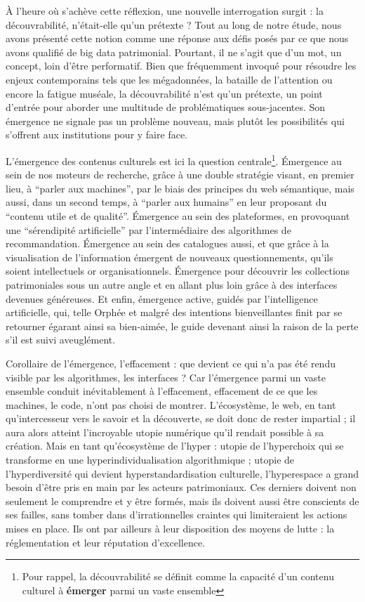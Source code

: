 \documentclass[a4paper,12pt,twoside]{book}
\begin{document}
	À l'heure où s'achève cette réflexion, une nouvelle interrogation surgit : la découvrabilité, n'était-elle qu'un prétexte ? Tout au long de notre étude, nous avons présenté cette notion comme une réponse aux défis posés par ce que nous avons qualifié de big data patrimonial. Pourtant, il ne s'agit que d'un mot, un concept, loin d’être performatif. Bien que fréquemment invoqué pour résoudre les enjeux contemporains tels que les mégadonnées, la bataille de l'attention ou encore la fatigue muséale, la découvrabilité n’est qu’un prétexte, un point d'entrée pour aborder une multitude de problématiques sous-jacentes. Son émergence ne signale pas un problème nouveau, mais plutôt les possibilités qui s'offrent aux institutions pour y faire face.
	
	L’émergence des contenus culturels est ici la question centrale\footnote{Pour rappel, la découvrabilité se définit comme la capacité d'un contenu culturel à \textbf{émerger} parmi un vaste ensemble}. Émergence au sein de nos moteurs de recherche, grâce à une double stratégie visant, en premier lieu, à \enquote{parler aux machines}, par le biais des principes du web sémantique, mais aussi, dans un second temps, à \enquote{parler aux humains} en leur proposant du \enquote{contenu utile et de qualité}. Émergence au sein des plateformes, en provoquant une \enquote{sérendipité artificielle} par l’intermédiaire des algorithmes de recommandation. Émergence au sein des catalogues aussi, et que grâce à la visualisation de l’information émergent de nouveaux questionnements, qu’ils soient intellectuels or organisationnels. Émergence pour découvrir les collections patrimoniales sous un autre angle et en allant plus loin grâce à des interfaces devenues généreuses. Et enfin, émergence active, guidés par l’intelligence artificielle, qui, telle Orphée et malgré des intentions bienveillantes finit par se retourner égarant ainsi sa bien-aimée, le guide devenant ainsi la raison de la perte s’il est suivi aveuglément.
	
	Corollaire de l’émergence, l’effacement : que devient ce qui n’a pas été rendu visible par les algorithmes, les interfaces ? Car l’émergence parmi un vaste ensemble conduit inévitablement à l’effacement, effacement de ce que les machines, le code, n’ont pas choisi de montrer. L’écosystème, le web, en tant qu’intercesseur vers le savoir et la découverte, se doit donc de rester impartial ; il aura alors atteint l’incroyable utopie numérique qu’il rendait possible à sa création. Mais en tant qu’écosystème de l’hyper : utopie de l’hyperchoix qui se transforme en une hyperindividualisation algorithmique ; utopie de l’hyperdiversité qui devient hyperstandardisation culturelle, l’hyperespace a grand besoin d’être pris en main par les acteurs patrimoniaux. Ces derniers doivent non seulement le comprendre et y être formés, mais ils doivent aussi être conscients de ses failles, sans tomber dans d'irrationnelles craintes qui limiteraient les actions mises en place. Ils ont par ailleurs à leur disposition des moyens de lutte : la réglementation et leur réputation d’excellence.
	
\end{document}
